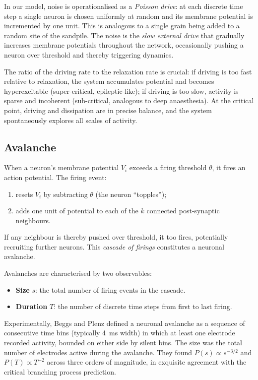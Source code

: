 \documentclass[12pt,a4paper]{article}
\begin{document}
In our model, noise is operationalised as a \emph{Poisson drive}: at
each discrete time step a single neuron is chosen uniformly at random
and its membrane potential is incremented by one unit.  This is
analogous to a single grain being added to a random site of the
sandpile.  The noise is the \emph{slow external drive} that gradually
increases membrane potentials throughout the network, occasionally
pushing a neuron over threshold and thereby triggering dynamics.

The ratio of the driving rate to the relaxation rate is crucial: if
driving is too fast relative to relaxation, the system accumulates
potential and becomes hyperexcitable (super-critical, epileptic-like);
if driving is too slow, activity is sparse and incoherent
(sub-critical, analogous to deep anaesthesia).  At the critical point,
driving and dissipation are in precise balance, and the system
spontaneously explores all scales of activity.

\subsection{Avalanche}

When a neuron's membrane potential $V_i$ exceeds a firing threshold
$\theta$, it fires an action potential.  The firing event:
\begin{enumerate}[noitemsep]
  \item resets $V_i$ by subtracting $\theta$ (the neuron ``topples'');
  \item adds one unit of potential to each of the $k$ connected
        post-synaptic neighbours.
\end{enumerate}
If any neighbour is thereby pushed over threshold, it too fires,
potentially recruiting further neurons.  This \emph{cascade of
firings} constitutes a neuronal avalanche.

Avalanches are characterised by two observables:
\begin{itemize}[noitemsep]
  \item \textbf{Size} $s$: the total number of firing events in the cascade.
  \item \textbf{Duration} $T$: the number of discrete time steps
        from first to last firing.
\end{itemize}

Experimentally, Beggs and Plenz \cite{beggs2003} defined a neuronal
avalanche as a sequence of consecutive time bins (typically 4~ms
width) in which at least one electrode recorded activity, bounded on
either side by silent bins.  The size was the total number of
electrodes active during the avalanche.  They found $P(s) \propto
s^{-3/2}$ and $P(T) \propto T^{-2}$ across three orders of
magnitude, in exquisite agreement with the critical branching process
prediction.
\end{document}
